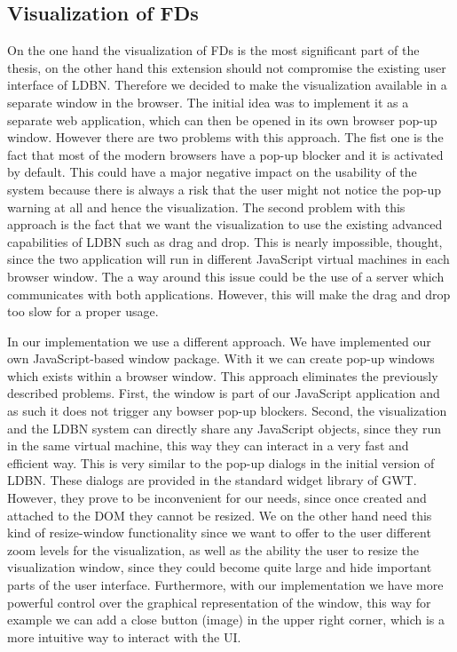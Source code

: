\subsection{Visualization of FDs}
On the one hand the visualization of FDs is the most significant part of the thesis, 
on the other hand this extension should not compromise the existing 
user interface of LDBN. Therefore we decided to
make the visualization available in a separate window in the browser. The initial idea
was to implement it as a separate web application, which can then be opened in its own 
browser pop-up window. However there are two problems with this approach. The fist one is
the fact that most of the modern browsers have a pop-up blocker and it is activated by default.
This could have a major negative impact on the usability of the system because there
is always a risk that the user might not notice the pop-up 
warning at all and hence the visualization. The second problem with this approach is 
the fact that we want the visualization to use the existing 
advanced capabilities of LDBN such as drag and drop. This is nearly impossible, thought, since
the two application will run in different JavaScript virtual machines in each
browser window. The a way around this issue could be the use of a server
which communicates with both applications. However, this will make the drag and drop too 
slow for a proper usage. 

In our implementation we use a different approach. We have implemented our own 
JavaScript-based window package.
With it we can create pop-up windows which exists within a browser window. 
This approach eliminates the previously described problems. First,
the window is part of our JavaScript application and as such it does not 
trigger any bowser pop-up
blockers. Second, the visualization and the LDBN system can directly share any 
JavaScript objects, since they run in the same virtual machine, 
this way they can interact in a very fast and efficient way. 
This is very similar to the pop-up dialogs in the initial version of LDBN. 
These dialogs are provided in the standard widget library of GWT. 
However, they prove to be inconvenient for our needs, since once created and attached 
to the DOM they cannot be resized. We on the other hand
need this kind of resize-window functionality since we want to offer to the user
different zoom levels for the visualization, as well as the ability the user to resize the
visualization window, since they could become quite large and hide important parts of the user 
interface. Furthermore, with our implementation we have more powerful control over
the graphical representation of the window, this way for example we can add a close button (image)
in the upper right corner, which is a more intuitive way to interact with the UI.

